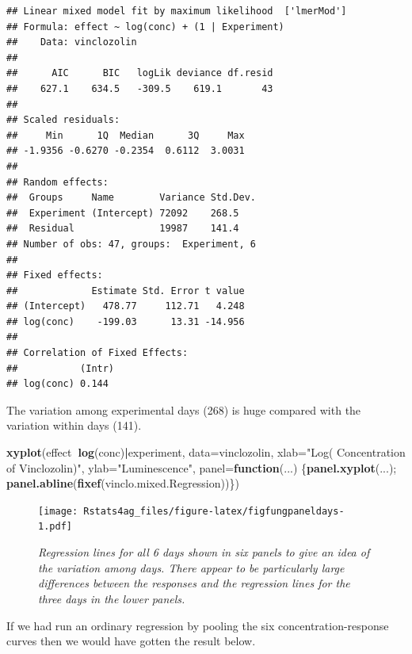 \documentclass[letterpaper,]{book}
\newenvironment{Shaded}{\begin{snugshade}}{\end{snugshade}}
\newcommand{\ControlFlowTok}[1]{\textcolor[rgb]{0.13,0.29,0.53}{\textbf{#1}}}
\newcommand{\DataTypeTok}[1]{\textcolor[rgb]{0.13,0.29,0.53}{#1}}
\newcommand{\KeywordTok}[1]{\textcolor[rgb]{0.13,0.29,0.53}{\textbf{#1}}}
\newcommand{\NormalTok}[1]{#1}
\newcommand{\OperatorTok}[1]{\textcolor[rgb]{0.81,0.36,0.00}{\textbf{#1}}}
\newcommand{\StringTok}[1]{\textcolor[rgb]{0.31,0.60,0.02}{#1}}
\begin{document}
\begin{verbatim}
## Linear mixed model fit by maximum likelihood  ['lmerMod']
## Formula: effect ~ log(conc) + (1 | Experiment)
##    Data: vinclozolin
## 
##      AIC      BIC   logLik deviance df.resid 
##    627.1    634.5   -309.5    619.1       43 
## 
## Scaled residuals: 
##     Min      1Q  Median      3Q     Max 
## -1.9356 -0.6270 -0.2354  0.6112  3.0031 
## 
## Random effects:
##  Groups     Name        Variance Std.Dev.
##  Experiment (Intercept) 72092    268.5   
##  Residual               19987    141.4   
## Number of obs: 47, groups:  Experiment, 6
## 
## Fixed effects:
##             Estimate Std. Error t value
## (Intercept)   478.77     112.71   4.248
## log(conc)    -199.03      13.31 -14.956
## 
## Correlation of Fixed Effects:
##           (Intr)
## log(conc) 0.144
\end{verbatim}

The variation among experimental days (268) is huge compared with the variation within days (141).



\begin{Shaded}
\begin{Highlighting}[]
\KeywordTok{xyplot}\NormalTok{(effect}\OperatorTok{~}\KeywordTok{log}\NormalTok{(conc)}\OperatorTok{|}\NormalTok{experiment, }\DataTypeTok{data=}\NormalTok{vinclozolin,}
       \DataTypeTok{xlab=}\StringTok{"Log( Concentration of Vinclozolin)"}\NormalTok{, }\DataTypeTok{ylab=}\StringTok{"Luminescence"}\NormalTok{,}
       \DataTypeTok{panel=}\ControlFlowTok{function}\NormalTok{(...)}
\NormalTok{         \{}\KeywordTok{panel.xyplot}\NormalTok{(...);}
          \KeywordTok{panel.abline}\NormalTok{(}\KeywordTok{fixef}\NormalTok{(vinclo.mixed.Regression))\})}
\end{Highlighting}
\end{Shaded}

\begin{figure}
\centering
\texttt{[image: Rstats4ag\_files/figure-latex/figfungpaneldays-1.pdf]}
\caption{\label{fig:figfungpaneldays}\emph{Regression lines for all 6 days shown in six panels to give an idea of the variation among days. There appear to be particularly large differences between the responses and the regression lines for the three days in the lower panels.}}
\end{figure}

If we had run an ordinary regression by pooling the six concentration-response curves then we would have gotten the result below.
\end{document}
